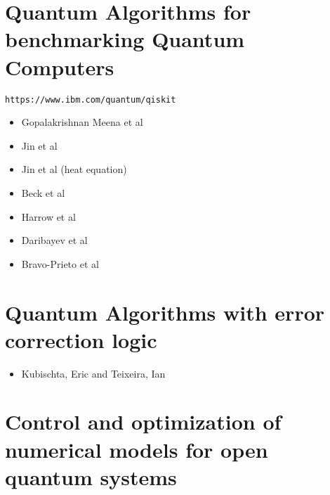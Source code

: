 \documentclass[]{article}
\begin{document}
\begin{comment}
	1. PDE constrained optimization and control. QUANDARY
	  (PDE constraint is Schrodinger equation)
	  Anders Petersson and Stefanie Guenther
	2. Quantum algorithms for benchmarking quantum computers
	   Shi Jin, Antigoni Georgiadou
	3. Quantum error correction algorithms
	   Eric Kubischta
	4. Density functional theory
	   Lin Lin
\end{comment}

\section{Quantum Algorithms for benchmarking Quantum Computers}

\verb=https://www.ibm.com/quantum/qiskit=
\begin{comment}
mkdir qiskit
cd qiskit
pip3 install qiskit
python3 -m venv venv_sussman
source venv_sussman/bin/activate (this should be done every session)
python3 -m pip install qiskit
pip3 install qiskit-aer
pip3 install matplotlib
pip3 install qiskit-ibm-runtime
python3 hadamard_gate.py
\end{comment}

\begin{itemize}
\item Gopalakrishnan Meena et al\cite{gopalakrishnan2024solving}
\item Jin et al\cite{doi:10.1137/23M1563451}
\item Jin et al (heat equation)\cite{jin2024quantum}
\item Beck et al\cite{beck2024integrating}
\item Harrow et al\cite{harrow2009quantum}
\item Daribayev et al\cite{daribayev2023implementation}
\item Bravo-Prieto et al\cite{bravo2023variational}
\end{itemize}

\section{Quantum Algorithms with error correction logic}

\begin{itemize}
\item Kubischta, Eric and Teixeira, Ian\cite{kubischta2023family}
\end{itemize}

\section{Control and optimization of numerical models for open
  quantum systems}
\end{document}
